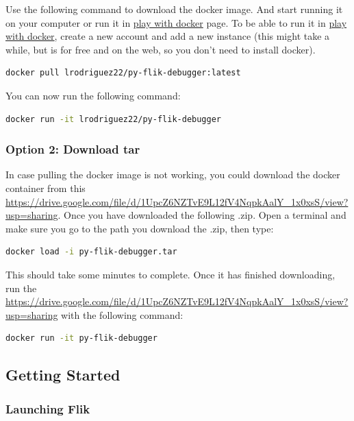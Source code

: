 Use the following command to download the docker image. And start running it on your computer or run it in \href{https://labs.play-with-docker.com/}{play with docker} page. To be able to run it in \href{https://labs.play-with-docker.com/}{play with docker}, create a new account and add a new instance (this might take a while, but is for free and on the web, so you don’t need to install docker).

\begin{lstlisting}[language=bash]
docker pull lrodriguez22/py-flik-debugger:latest
\end{lstlisting}

You can now run the following command:

\begin{lstlisting}[language=bash]
docker run -it lrodriguez22/py-flik-debugger
\end{lstlisting}

\subsubsection{Option 2: Download tar}
In case pulling the docker image is not working, you could download the docker container from this \href{docker container}{https://drive.google.com/file/d/1UpcZ6NZTvE9L12fV4NqpkAalY\_1x0xsS/view?usp=sharing}. Once you have downloaded the following .zip. Open a terminal and make sure you go to the path you download the .zip, then type:

\begin{lstlisting}[language=bash]
docker load -i py-flik-debugger.tar
\end{lstlisting}

This should take some minutes to complete. Once it has finished downloading, run the \href{docker container}{https://drive.google.com/file/d/1UpcZ6NZTvE9L12fV4NqpkAalY\_1x0xsS/view?usp=sharing} with the following command:

\begin{lstlisting}[language=bash]
docker run -it py-flik-debugger
\end{lstlisting}

\subsection{Getting Started}
\subsubsection{Launching Flik}

